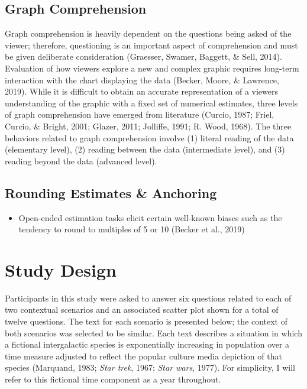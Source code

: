 \documentclass[print]{nuthesis}
\providecommand{\tightlist}{%
  \setlength{\itemsep}{0pt}\setlength{\parskip}{0pt}}
\begin{document}
\hypertarget{graph-comprehension}{%
\subsection{Graph Comprehension}\label{graph-comprehension}}

Graph comprehension is heavily dependent on the questions being asked of the viewer; therefore, questioning is an important aspect of comprehension and must be given deliberate consideration (Graesser, Swamer, Baggett, \& Sell, 2014).
Evaluation of how viewers explore a new and complex graphic requires long-term interaction with the chart displaying the data (Becker, Moore, \& Lawrence, 2019).
While it is difficult to obtain an accurate representation of a viewers understanding of the graphic with a fixed set of numerical estimates, three levels of graph comprehension have emerged from literature (Curcio, 1987; Friel, Curcio, \& Bright, 2001; Glazer, 2011; Jolliffe, 1991; R. Wood, 1968).
The three behaviors related to graph comprehension involve (1) literal reading of the data (elementary level), (2) reading between the data (intermediate level), and (3) reading beyond the data (advanced level).

\hypertarget{rounding-estimates-anchoring}{%
\subsection{Rounding Estimates \& Anchoring}\label{rounding-estimates-anchoring}}

\begin{itemize}
\tightlist
\item
  Open-ended estimation tasks elicit certain well-known biases such as the tendency to round to multiples of 5 or 10 (Becker et al., 2019)
\end{itemize}

\hypertarget{study-design-2}{%
\section{Study Design}\label{study-design-2}}

Participants in this study were asked to answer six questions related to each of two contextual scenarios and an associated scatter plot shown for a total of twelve questions.
The text for each scenario is presented below; the context of both scenarios was selected to be similar.
Each text describes a situation in which a fictional intergalactic species is exponentially increasing in population over a time measure adjusted to reflect the popular culture media depiction of that species (Marquand, 1983; \emph{Star trek}, 1967; \emph{Star wars}, 1977). For simplicity, I will refer to this fictional time component as a year throughout.
\end{document}
